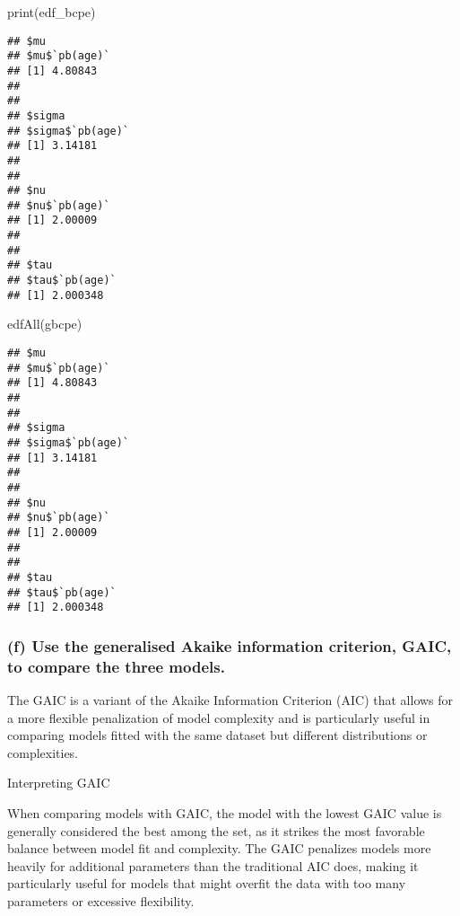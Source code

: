 \documentclass[
]{article}
\newenvironment{Shaded}{\begin{snugshade}}{\end{snugshade}}
\newcommand{\FunctionTok}[1]{\textcolor[rgb]{0.00,0.00,0.00}{#1}}
\newcommand{\NormalTok}[1]{#1}
\begin{document}
\begin{Shaded}
\begin{Highlighting}[]
\FunctionTok{print}\NormalTok{(edf\_bcpe)}
\end{Highlighting}
\end{Shaded}

\begin{verbatim}
## $mu
## $mu$`pb(age)`
## [1] 4.80843
## 
## 
## $sigma
## $sigma$`pb(age)`
## [1] 3.14181
## 
## 
## $nu
## $nu$`pb(age)`
## [1] 2.00009
## 
## 
## $tau
## $tau$`pb(age)`
## [1] 2.000348
\end{verbatim}

\begin{Shaded}
\begin{Highlighting}[]
\FunctionTok{edfAll}\NormalTok{(gbcpe)}
\end{Highlighting}
\end{Shaded}

\begin{verbatim}
## $mu
## $mu$`pb(age)`
## [1] 4.80843
## 
## 
## $sigma
## $sigma$`pb(age)`
## [1] 3.14181
## 
## 
## $nu
## $nu$`pb(age)`
## [1] 2.00009
## 
## 
## $tau
## $tau$`pb(age)`
## [1] 2.000348
\end{verbatim}

\hypertarget{f-use-the-generalised-akaike-information-criterion-gaic-to-compare-the-three-models.}{%
\subsubsection{(f) Use the generalised Akaike information criterion,
GAIC, to compare the three
models.}\label{f-use-the-generalised-akaike-information-criterion-gaic-to-compare-the-three-models.}}

The GAIC is a variant of the Akaike Information Criterion (AIC) that
allows for a more flexible penalization of model complexity and is
particularly useful in comparing models fitted with the same dataset but
different distributions or complexities.

Interpreting GAIC

When comparing models with GAIC, the model with the lowest GAIC value is
generally considered the best among the set, as it strikes the most
favorable balance between model fit and complexity. The GAIC penalizes
models more heavily for additional parameters than the traditional AIC
does, making it particularly useful for models that might overfit the
data with too many parameters or excessive flexibility.
\end{document}

